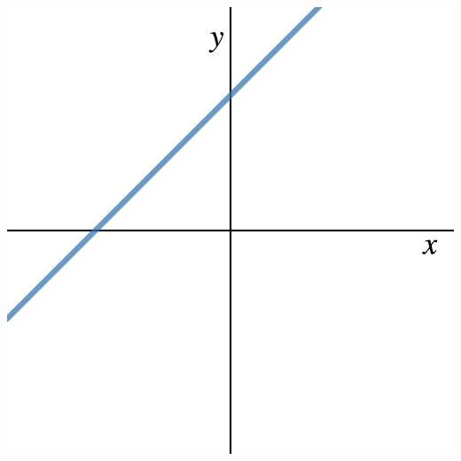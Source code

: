 \documentclass[11pt]{exam}
\theoremstyle{definition}
\begin{document}
\begin{questions}
\begin{enumerate}[(I)]
\begin{minipage}{.35\textwidth}
	\end{minipage}
	\begin{minipage}{.35\textwidth}
	\item \includegraphics[scale=0.1]{linearVI.png}
	\end{minipage}
\end{enumerate}
\end{questions}
\end{document}
